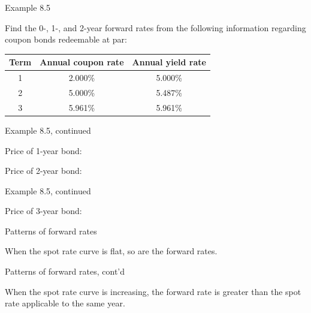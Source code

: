 \documentclass{beamer}
\begin{document}
\begin{frame}{Example 8.5}

Find the 0-, 1-, and 2-year forward rates from the following information regarding coupon bonds redeemable at par:

\begin{center}
\begin{tabular}{ccc}
\toprule
\textbf{Term} & \textbf{Annual coupon rate} & \textbf{Annual yield rate} \\
\midrule
1 & 2.000\% & 5.000\% \\
2 & 5.000\% & 5.487\% \\
3 & 5.961\% & 5.961\% \\
\bottomrule
\end{tabular}
\end{center}

\vfill
\end{frame}

\begin{frame}{Example 8.5, continued}

Price of 1-year bond:

\vspace{10em}
Price of 2-year bond:

\vfill
\end{frame}

\begin{frame}{Example 8.5, continued}

Price of 3-year bond:

\vfill
\end{frame}

\begin{frame}{Patterns of forward rates}

When the spot rate curve is flat, so are the forward rates.

\begin{center}
\end{center}

\vfill
\end{frame}

\begin{frame}{Patterns of forward rates, cont'd}

When the spot rate curve is increasing, the forward rate is greater than the spot rate applicable to the same year.

\begin{center}
\end{center}

\vfill
\end{frame}
\end{document}
